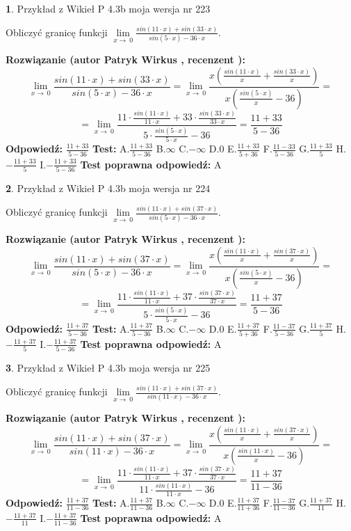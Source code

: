 \documentclass[12pt, a4paper]{article}
\theoremstyle{definition} %
\newtheorem{zad}{}
\newcommand{\zadStart}[1]{\begin{zad}#1\newline}
\newcommand{\zadStop}{\end{zad}}
\newcommand{\rozwStart}[2]{\noindent \textbf{Rozwiązanie (autor #1 , recenzent #2): }\newline}
\newcommand{\rozwStop}{\newline}
\newcommand{\odpStart}{\noindent \textbf{Odpowiedź:}\newline}
\newcommand{\odpStop}{\newline}
\newcommand{\testStart}{\noindent \textbf{Test:}\newline}
\newcommand{\testStop}{\newline}
\newcommand{\kluczStart}{\noindent \textbf{Test poprawna odpowiedź:}\newline}
\newcommand{\kluczStop}{\newline}
\begin{document}
\zadStart{Przykład z Wikieł P 4.3b moja wersja nr 223}


Obliczyć granicę funkcji $\lim\limits_{x\to\ 0}\frac{sin(11 \cdot x)+sin(33 \cdot x)}{sin(5 \cdot x)-36 \cdot x}$.
\zadStop
\rozwStart{Patryk Wirkus}{}
$$\lim\limits_{x\to\ 0}\frac{sin(11 \cdot x)+sin(33 \cdot x)}{sin(5 \cdot x)-36 \cdot x}=\lim\limits_{x\to\ 0}\frac{x(\frac{sin(11 \cdot x)}{x}+\frac{sin(33 \cdot x)}{x})}{x(\frac{sin(5 \cdot x)}{x}-36)}=$$
$$=\lim\limits_{x\to\ 0}\frac{11 \cdot \frac{sin(11 \cdot x)}{11 \cdot x}+33 \cdot \frac{sin(33 \cdot x)}{33 \cdot x}}{5 \cdot \frac{sin(5 \cdot x)}{5 \cdot x}-36}=\frac{11+33}{5-36}$$
\rozwStop
\odpStart
$\frac{11+33}{5-36}$
\odpStop
\testStart
A.$\frac{11+33}{5-36}$
B.$\infty$
C.$-\infty$
D.$0$
E.$\frac{11+33}{5+36}$
F.$\frac{11-33}{5-36}$
G.$\frac{11+33}{5}$
H.$-\frac{11+33}{5}$
I.$-\frac{11+33}{5-36}$
\testStop
\kluczStart
A
\kluczStop



\zadStart{Przykład z Wikieł P 4.3b moja wersja nr 224}


Obliczyć granicę funkcji $\lim\limits_{x\to\ 0}\frac{sin(11 \cdot x)+sin(37 \cdot x)}{sin(5 \cdot x)-36 \cdot x}$.
\zadStop
\rozwStart{Patryk Wirkus}{}
$$\lim\limits_{x\to\ 0}\frac{sin(11 \cdot x)+sin(37 \cdot x)}{sin(5 \cdot x)-36 \cdot x}=\lim\limits_{x\to\ 0}\frac{x(\frac{sin(11 \cdot x)}{x}+\frac{sin(37 \cdot x)}{x})}{x(\frac{sin(5 \cdot x)}{x}-36)}=$$
$$=\lim\limits_{x\to\ 0}\frac{11 \cdot \frac{sin(11 \cdot x)}{11 \cdot x}+37 \cdot \frac{sin(37 \cdot x)}{37 \cdot x}}{5 \cdot \frac{sin(5 \cdot x)}{5 \cdot x}-36}=\frac{11+37}{5-36}$$
\rozwStop
\odpStart
$\frac{11+37}{5-36}$
\odpStop
\testStart
A.$\frac{11+37}{5-36}$
B.$\infty$
C.$-\infty$
D.$0$
E.$\frac{11+37}{5+36}$
F.$\frac{11-37}{5-36}$
G.$\frac{11+37}{5}$
H.$-\frac{11+37}{5}$
I.$-\frac{11+37}{5-36}$
\testStop
\kluczStart
A
\kluczStop



\zadStart{Przykład z Wikieł P 4.3b moja wersja nr 225}


Obliczyć granicę funkcji $\lim\limits_{x\to\ 0}\frac{sin(11 \cdot x)+sin(37 \cdot x)}{sin(11 \cdot x)-36 \cdot x}$.
\zadStop
\rozwStart{Patryk Wirkus}{}
$$\lim\limits_{x\to\ 0}\frac{sin(11 \cdot x)+sin(37 \cdot x)}{sin(11 \cdot x)-36 \cdot x}=\lim\limits_{x\to\ 0}\frac{x(\frac{sin(11 \cdot x)}{x}+\frac{sin(37 \cdot x)}{x})}{x(\frac{sin(11 \cdot x)}{x}-36)}=$$
$$=\lim\limits_{x\to\ 0}\frac{11 \cdot \frac{sin(11 \cdot x)}{11 \cdot x}+37 \cdot \frac{sin(37 \cdot x)}{37 \cdot x}}{11 \cdot \frac{sin(11 \cdot x)}{11 \cdot x}-36}=\frac{11+37}{11-36}$$
\rozwStop
\odpStart
$\frac{11+37}{11-36}$
\odpStop
\testStart
A.$\frac{11+37}{11-36}$
B.$\infty$
C.$-\infty$
D.$0$
E.$\frac{11+37}{11+36}$
F.$\frac{11-37}{11-36}$
G.$\frac{11+37}{11}$
H.$-\frac{11+37}{11}$
I.$-\frac{11+37}{11-36}$
\testStop
\kluczStart
A
\kluczStop
\end{document}
